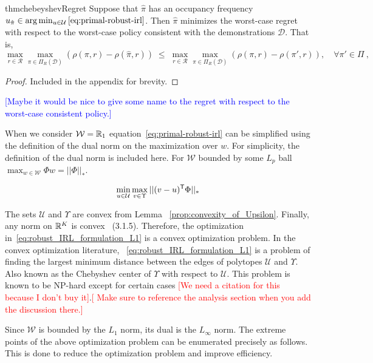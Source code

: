 \documentclass[11pt]{uai2023}
\newcommand{\mm}[1]{\textcolor{blue}{[#1]}}
\newcommand{\gersi}[1]{\textcolor{red}{[#1]}}
\begin{document}
\begin{restatable}{thm}{chebeyshevRegret}
\label{thrm:chebeyshevRegret}
	Suppose that $\hat{\pi}$ has an occupancy frequency $u_{\hat{\pi}} \in \arg\min_{u \in \mathcal{U}} \ref{eq:primal-robust-irl}$.
	Then $\hat{\pi}$ minimizes the worst-case regret with respect to the worst-case policy consistent with the demonstrations $\mathcal{D}$. That is,
	\[
		\max_{r\in \mathcal{R}} \max_{\pi \in \Pi_{R}(\mathcal{D})} \left(\rho(\pi, r) - \rho(\hat{\pi}, r)\right)
		\; \le\;
		\max_{r\in \mathcal{R}} \max_{\pi \in \Pi_{R}(\mathcal{D})} \left(\rho(\pi, r) - \rho(\pi', r)\right), \quad  \forall \pi' \in \Pi~,
	\]
\end{restatable}

\begin{proof}
	Included in the appendix for brevity.
\end{proof}

\mm{Maybe it would be nice to give some name to the regret with respect to the worst-case consistent policy.}

When we consider $\mathcal{W} = \mathbb{R}_{1}$ equation~\eqref{eq:primal-robust-irl} can be simplified using the definition of the dual norm on the maximization
over $w$. For simplicity, the definition of the dual norm is included here. For $\mathcal{W}$ bounded by some $L_p$ ball $\max_{w \in \mathcal{W}} \Phi w = ||\Phi||_*$.

\begin{equation}
	\label{eq:robust_IRL_formulation_L1}
	\min_{u \in \mathcal{U}} \max_{v \in \Upsilon} ||(v - u)^{\mathsf{T}} \Phi||_*
\end{equation}

The sets $\mathcal{U}$ and $\Upsilon$ are convex from Lemma ~\ref{prop:convexity_of_Upsilon}.
Finally, any norm on $\mathbb{R}^K$ is convex~\cite{boyd_convex_optimization} (3.1.5).
Therefore, the optimization in~\eqref{eq:robust_IRL_formulation_L1} is a convex
optimization problem. In the convex optimization literature,
~\eqref{eq:robust_IRL_formulation_L1} is a problem of finding the largest minimum
distance between the edges of polytopes $\mathcal{U}$ and $\Upsilon$. Also known as the Chebyshev center of $\Upsilon$ with respect to $\mathcal{U}$.
This problem is known to be NP-hard except for certain cases \gersi{We need a
	citation for this because I don't buy it}.\gersi{ Make sure to reference the analysis section when you add the discussion there.}

Since $\mathcal{W}$ is bounded by the $L_1$ norm, its dual is the $L_\infty$ norm. The extreme points of the above
optimization problem can be enumerated precisely as follows.
This is done to reduce the optimization problem and improve efficiency.
\end{document}
